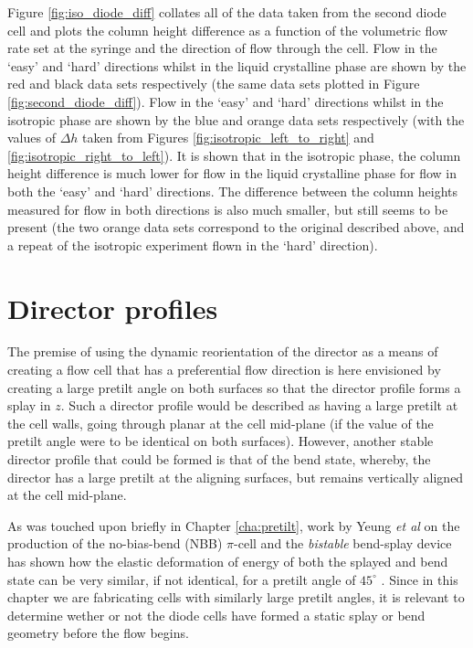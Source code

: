 Figure \ref{fig:iso_diode_diff} collates all of the data taken from the second diode cell and plots the column height difference as a function of the volumetric flow rate set at the syringe and the direction of flow through the cell. Flow in the `easy' and `hard' directions whilst in the liquid crystalline phase  are shown by the red and black data sets respectively (the same data sets plotted in Figure \ref{fig:second_diode_diff}). Flow in the `easy' and `hard' directions whilst in the isotropic phase are shown by the blue and orange data sets respectively (with the values of $\Delta h$ taken from Figures \ref{fig:isotropic_left_to_right} and \ref{fig:isotropic_right_to_left}). It is shown that in the isotropic phase, the column height difference is much lower for flow in the liquid crystalline phase for flow in both the `easy' and `hard' directions. The difference between the column heights measured for flow in both directions is also much smaller, but still seems to be present (the two orange data sets correspond to the original described above, and a repeat of the isotropic experiment flown in the `hard' direction). 

\section{Director profiles}
The premise of using the dynamic reorientation of the director as a means of creating a flow cell that has a preferential flow direction is here envisioned by creating a large pretilt angle on both surfaces so that the director profile forms a splay in $z$. Such a director profile would be described as having a large pretilt at the cell walls, going through planar at the cell mid-plane (if the value of the pretilt angle were to be identical on both surfaces). However, another stable director profile that could be formed is that of the bend state, whereby, the director has a large pretilt at the aligning surfaces, but remains vertically aligned at the cell mid-plane.

As was touched upon briefly in Chapter \ref{cha:pretilt}, work by Yeung \textit{et al} \cite{Yeung2006,Yu2004,Yeung2005} on the production of the no-bias-bend (NBB) $\pi$-cell and the \textit{bistable} bend-splay device has shown how the elastic deformation of energy of both the splayed and bend state can be very similar, if not identical, for a pretilt angle of $45^{\circ}$ \cite{Yeung2005}. Since in this chapter we are fabricating cells with similarly large pretilt angles, it is relevant to determine wether or not the diode cells have formed a static splay or bend geometry before the flow begins.


